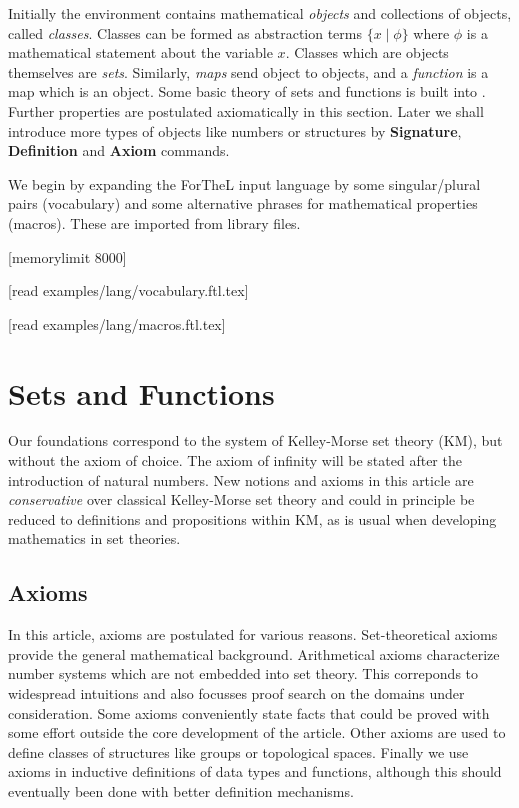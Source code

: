 \documentclass[english,11pt]{article}
\begin{document}
Initially the environment contains 
mathematical \textit{objects} and collections of objects, called \textit{classes}. Classes can
be formed as abstraction terms $\{x\mid\phi\}$ where $\phi$ is a mathematical
statement about the variable $x$. Classes which are objects themselves are 
\textit{sets}. Similarly, \textit{maps} send object to objects, and a \textit{function}
is a map which is an object.
Some basic theory of sets and functions is built into \Naproche. Further properties
are postulated axiomatically in this section. Later we shall introduce more types 
of objects like numbers or structures 
by \textbf{Signature}, \textbf{Definition} and \textbf{Axiom} commands.

We begin by expanding the ForTheL input language by some
singular/plural pairs (vocabulary) and some alternative phrases 
for mathematical properties (macros). These are imported from
library files.


\begin{forthel}



[memorylimit 8000]


[read examples/lang/vocabulary.ftl.tex]

[read examples/lang/macros.ftl.tex]

\end{forthel}

\section{Sets and Functions}
Our foundations correspond to the system of Kelley-Morse set theory (KM), 
but without the axiom of choice. The axiom of infinity will be stated after
the introduction of natural numbers.
New notions and axioms in
this article are \textit{conservative} over classical Kelley-Morse set theory and 
could in principle be reduced to definitions and propositions within
KM, as is usual when developing mathematics in set theories.

\subsection{Axioms}

In this article, axioms are postulated for various reasons. Set-theoretical
axioms provide the general mathematical background. Arithmetical axioms 
characterize 
number systems which are not embedded into set theory. This correponds to
widespread intuitions and also focusses proof search on the domains under
consideration. Some axioms conveniently state facts that could be 
proved with some effort outside the core development of the article. 
Other axioms are used to define classes of structures like groups or 
topological spaces. Finally we use axioms in inductive definitions
of data types and functions, although this should eventually been done
with better definition mechanisms. 
\end{document}
